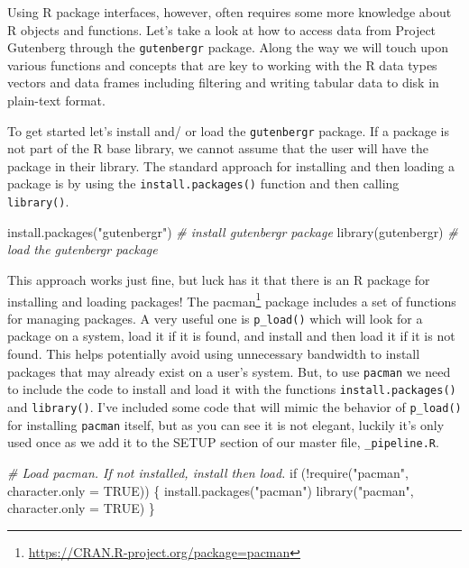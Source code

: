 \documentclass[
  letterpaper,
]{scrbook}
\newenvironment{Shaded}{\begin{snugshade}}{\end{snugshade}}
\newcommand{\AttributeTok}[1]{\textcolor[rgb]{0.00,0.00,0.00}{#1}}
\newcommand{\CommentTok}[1]{\textcolor[rgb]{0.00,0.00,0.00}{\textit{#1}}}
\newcommand{\ConstantTok}[1]{\textcolor[rgb]{0.00,0.00,0.00}{#1}}
\newcommand{\ControlFlowTok}[1]{\textcolor[rgb]{0.00,0.00,0.00}{#1}}
\newcommand{\FunctionTok}[1]{\textcolor[rgb]{0.00,0.00,0.00}{#1}}
\newcommand{\NormalTok}[1]{\textcolor[rgb]{0.00,0.00,0.00}{#1}}
\newcommand{\SpecialCharTok}[1]{\textcolor[rgb]{0.00,0.00,0.00}{#1}}
\newcommand{\StringTok}[1]{\textcolor[rgb]{0.00,0.00,0.00}{#1}}
\DeclareRobustCommand{\href}[2]{#2\footnote{\url{#1}}}
\begin{document}
Using R package interfaces, however, often requires some more knowledge
about R objects and functions. Let's take a look at how to access data
from Project Gutenberg through the \texttt{gutenbergr} package. Along
the way we will touch upon various functions and concepts that are key
to working with the R data types vectors and data frames including
filtering and writing tabular data to disk in plain-text format.

To get started let's install and/ or load the \texttt{gutenbergr}
package. If a package is not part of the R base library, we cannot
assume that the user will have the package in their library. The
standard approach for installing and then loading a package is by using
the \texttt{install.packages()} function and then calling
\texttt{library()}.

\begin{Shaded}
\begin{Highlighting}[]
\FunctionTok{install.packages}\NormalTok{(}\StringTok{"gutenbergr"}\NormalTok{) }\CommentTok{\# install \textasciigrave{}gutenbergr\textasciigrave{} package}
\FunctionTok{library}\NormalTok{(gutenbergr) }\CommentTok{\# load the \textasciigrave{}gutenbergr\textasciigrave{} package}
\end{Highlighting}
\end{Shaded}

This approach works just fine, but luck has it that there is an R
package for installing and loading packages! The
\href{https://CRAN.R-project.org/package=pacman}{pacman} package
includes a set of functions for managing packages. A very useful one is
\texttt{p\_load()} which will look for a package on a system, load it if
it is found, and install and then load it if it is not found. This helps
potentially avoid using unnecessary bandwidth to install packages that
may already exist on a user's system. But, to use \texttt{pacman} we
need to include the code to install and load it with the functions
\texttt{install.packages()} and \texttt{library()}. I've included some
code that will mimic the behavior of \texttt{p\_load()} for installing
\texttt{pacman} itself, but as you can see it is not elegant, luckily
it's only used once as we add it to the SETUP section of our master
file, \texttt{\_pipeline.R}.

\begin{Shaded}
\begin{Highlighting}[]
\CommentTok{\# Load \textasciigrave{}pacman\textasciigrave{}. If not installed, install then load.}
\ControlFlowTok{if}\NormalTok{ (}\SpecialCharTok{!}\FunctionTok{require}\NormalTok{(}\StringTok{"pacman"}\NormalTok{, }\AttributeTok{character.only =} \ConstantTok{TRUE}\NormalTok{)) \{}
  \FunctionTok{install.packages}\NormalTok{(}\StringTok{"pacman"}\NormalTok{)}
  \FunctionTok{library}\NormalTok{(}\StringTok{"pacman"}\NormalTok{, }\AttributeTok{character.only =} \ConstantTok{TRUE}\NormalTok{)}
\NormalTok{\}}
\end{Highlighting}
\end{Shaded}
\end{document}
